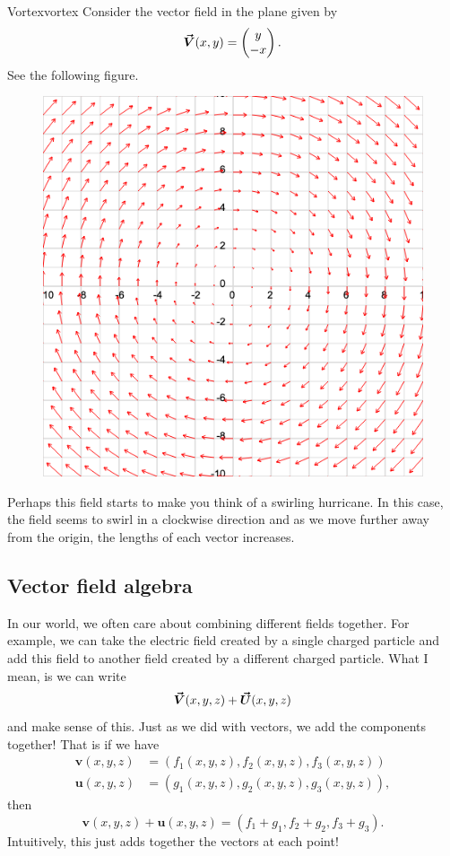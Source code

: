                 \begin{ex}{Vortex}{vortex}
                Consider the vector field in the plane given by
                \[
                \boldsymbol{\vec{V}}(x,y)=\begin{pmatrix} y \\ -x \end{pmatrix}.
                \]
                See the following figure.
                \begin{figure}[H]
                    \centering
                    \includegraphics[width=.6\textwidth]{Figures_Part_6/v_field_3.png}
                \end{figure}
                Perhaps this field starts to make you think of a swirling hurricane. In this case, the field seems to swirl in a clockwise direction and as we move further away from the origin, the lengths of each vector increases.
                \end{ex}    
        
        
        
        \subsection{Vector field algebra}
        In our world, we often care about combining different fields together.  For example, we can take the electric field created by a single charged particle and add this field to another field created by a different charged particle. What I mean, is we can write
        \[
        \boldsymbol{\vec{V}}(x,y,z)+\boldsymbol{\vec{U}}(x,y,z)
        \]
        and make sense of this.  Just as we did with vectors, we add the components together! That is if we have
        \begin{align*}
        \mathbf{v}(x,y,z)&=(f_1(x,y,z),f_2(x,y,z),f_3(x,y,z))\\ \mathbf{u}(x,y,z)&=(g_1(x,y,z),g_2(x,y,z),g_3(x,y,z)),
        \end{align*}
        then
        \[
        \mathbf{v}(x,y,z)+\mathbf{u}(x,y,z)=(f_1+g_1,f_2+g_2,f_3+g_3).
        \]
        Intuitively, this just adds together the vectors at each point!
        
